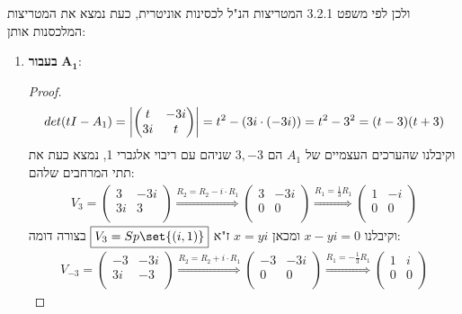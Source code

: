 \documentclass{article}
\DeclarePairedDelimiter\set\{\}
\begin{document}
	ולכן לפי משפט 3.2.1 המטריצות הנ"ל לכסינות אוניטרית, כעת נמצא את המטריצות המלכסנות אותן:
	\begin{enumerate}
		\item \textbf{בעבור} $\boldsymbol{A_1}$:
		\begin{proof}
			\begin{align*}
				det(tI - A_1)
				= \left| \begin{pmatrix}
					t & - 3i \\
					3i & t \\
				\end{pmatrix} \right|
				= t^2 - (3i \cdot (-3i))
				= t^2 - 3^2
				= (t-3)(t+3)
			\end{align*}
			וקיבלנו שהערכים העצמיים של $A_1$ הם $3, -3$ שניהם עם ריבוי אלגברי 1, נמצא כעת את תתי המרחבים שלהם:
			\begin{align*}
				V_3 = \begin{pmatrix}
					3 & - 3i \\
					3i & 3 \\
				\end{pmatrix}
				\overset{R_2 = R_2 - i \cdot R_1}\Rightarrow
				\begin{pmatrix}
					3 & - 3i \\
					0 & 0 \\
				\end{pmatrix}
				\overset{R_1 = \frac{1}{3}R_1}\Rightarrow
				\begin{pmatrix}
					1 & -i \\
					0 & 0 \\
				\end{pmatrix}
			\end{align*}
			וקיבלנו $x - yi = 0$ ומכאן $x = yi$ ז"א $\boxed{V_3 = Sp\set{(i, 1)}}$
			בצורה דומה:
			\begin{align*}
				V_{-3} = \begin{pmatrix}
					-3 & - 3i \\
					3i & -3 \\
				\end{pmatrix}
				\overset{R_2 = R_2 + i \cdot R_1}\Rightarrow
				\begin{pmatrix}
					-3 & - 3i \\
					0 & 0 \\
				\end{pmatrix}
				\overset{R_1 = -\frac{1}{3}R_1}\Rightarrow
				\begin{pmatrix}
					1 & i \\
					0 & 0 \\

\end{pmatrix}
\end{align*}
\end{proof}
\end{enumerate}
\end{document}
